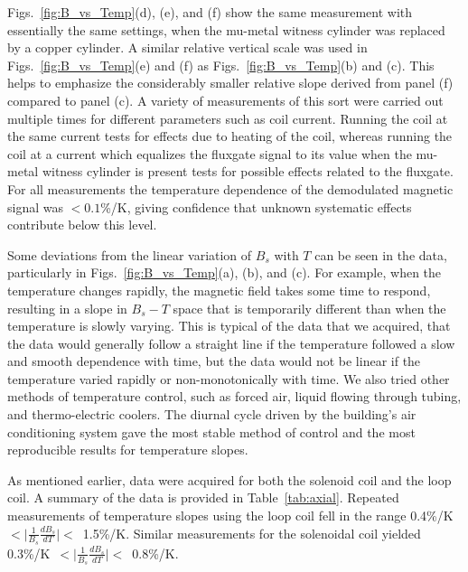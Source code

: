 Figs.~\ref{fig:B_vs_Temp}(d), (e), and (f) show the same measurement
with essentially the same settings, when the mu-metal witness cylinder
was replaced by a copper cylinder.  A similar relative vertical scale
was used in Figs.~\ref{fig:B_vs_Temp}(e) and (f) as
Figs.~\ref{fig:B_vs_Temp}(b) and (c).  This helps to emphasize the
considerably smaller relative slope derived from panel (f) compared to
panel (c).  A variety of measurements of this sort were carried out
multiple times for different parameters such as coil current.  Running
the coil at the same current tests for effects due to heating of the
coil, whereas running the coil at a current which equalizes the
fluxgate signal to its value when the mu-metal witness cylinder is
present tests for possible effects related to the fluxgate.  For all
measurements the temperature dependence of the demodulated magnetic
signal was $<0.1$\%/K, giving confidence that unknown systematic
effects contribute below this level.

Some deviations from the linear variation of $B_s$ with $T$ can be
seen in the data, particularly in Figs.~\ref{fig:B_vs_Temp}(a), (b),
and (c).  For example, when the temperature changes rapidly, the
magnetic field takes some time to respond, resulting in a slope in
$B_s-T$ space that is temporarily different than when the temperature
is slowly varying.  This is typical of the data that we acquired, that
the data would generally follow a straight line if the temperature
followed a slow and smooth dependence with time, but the data would
not be linear if the temperature varied rapidly or non-monotonically
with time.  We also tried other methods of temperature control, such
as forced air, liquid flowing through tubing, and thermo-electric
coolers.  The diurnal cycle driven by the building's air conditioning
system gave the most stable method of control and the most
reproducible results for temperature slopes.

As mentioned earlier, data were acquired for both the solenoid coil
and the loop coil. A summary of the data is provided in
Table~\ref{tab:axial}.  Repeated measurements of temperature slopes
using the loop coil fell in the range
0.4\%/K~$<\vert\frac{1}{B_s}\frac{dB_s}{dT}\vert<$~1.5\%/K.  Similar
measurements for the solenoidal coil yielded
0.3\%/K~$<\vert\frac{1}{B_s}\frac{dB_s}{dT}\vert<$~0.8\%/K.

